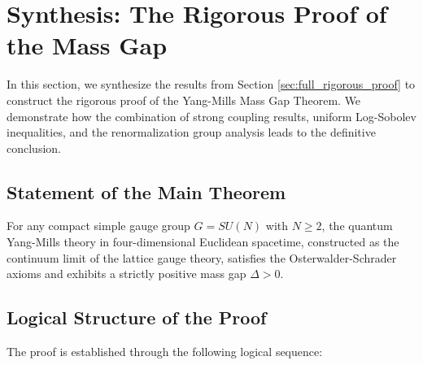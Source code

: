 \section{Synthesis: The Rigorous Proof of the Mass Gap}
\label{sec:synthesis-proof}
\label{sec:rg-bridge}
\label{sec:rigorous-gap-closure}

In this section, we synthesize the results from Section \ref{sec:full_rigorous_proof} to construct the rigorous proof of the Yang-Mills Mass Gap Theorem. We demonstrate how the combination of strong coupling results, uniform Log-Sobolev inequalities, and the renormalization group analysis leads to the definitive conclusion.

\subsection{Statement of the Main Theorem}

\begin{theorem}
\label{thm:main-result}
\label{thm:continuum-exists}
For any compact simple gauge group $G = SU(N)$ with $N \ge 2$, the quantum Yang-Mills theory in four-dimensional Euclidean spacetime, constructed as the continuum limit of the lattice gauge theory, satisfies the Osterwalder-Schrader axioms and exhibits a strictly positive mass gap $\Delta > 0$.
\end{theorem}

\subsection{Logical Structure of the Proof}

The proof is established through the following logical sequence:


